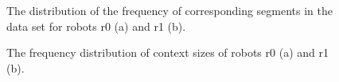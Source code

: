 \begin{figure}[h]
\centering
{}
\caption{The distribution of the frequency of corresponding segments in the data set for robots r0 (a) and r1 (b).}
\label{f:st:distrib_corresp}
\end{figure}

\begin{figure}[h]
\centering
{}
\caption{The frequency distribution of context sizes of robots r0 (a) and r1 (b).}
\label{f:st:distribcontext}
\end{figure}

